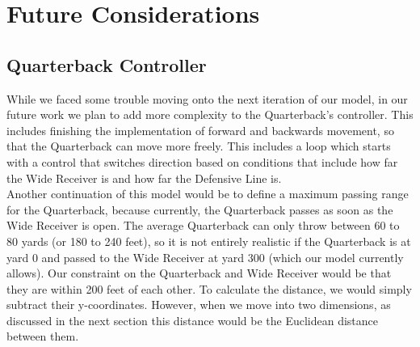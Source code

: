 
\section{Future Considerations}

\subsection{Quarterback Controller}

\quad While we faced some trouble moving onto the next iteration of our model, in our future work we plan to add more complexity to the Quarterback’s controller. This includes finishing the implementation of forward and backwards movement, so that the Quarterback can move more freely. This includes a loop which starts with a control that switches direction based on conditions that include how far the Wide Receiver is and how far the Defensive Line is. \\ 

Another continuation of this model would be to define a maximum passing range for the Quarterback, because currently, the Quarterback passes as soon as the Wide Receiver is open. The average Quarterback can only throw between 60 to 80 yards (or 180 to 240 feet), so it is not entirely realistic if the Quarterback is at yard 0 and passed to the Wide Receiver at yard 300 (which our model currently allows). Our constraint on the Quarterback and Wide Receiver would be that they are within 200 feet of each other. To calculate the distance, we would simply subtract their y-coordinates. However, when we move into two dimensions, as discussed in the next section this distance would be the Euclidean distance between them. \\


